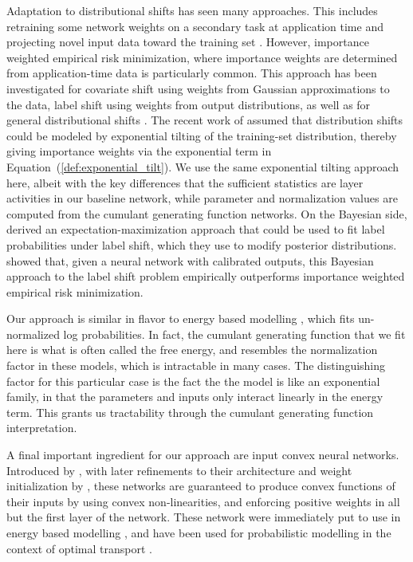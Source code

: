 \documentclass{article}      %
\begin{document}
Adaptation to distributional shifts has seen many approaches.
This includes retraining some network weights on a secondary task at application time \cite{sun_test-time_2020} and projecting novel input data toward the training set \cite{gao_back_2023}.
However, importance weighted empirical risk minimization, where importance weights are determined from application-time data is particularly common.
This approach has been investigated for covariate shift \cite{sugiyama_covariate_2007} using weights from Gaussian approximations to the data, label shift \cite{lipton_detecting_2018,garg_unified_2020} using weights from output distributions, as well as for general distributional shifts \cite{zhang_domain_2013,maity_understanding_2023}.
The recent work of \cite{maity_understanding_2023} assumed that distribution shifts could be modeled by exponential tilting of the training-set distribution, thereby giving importance weights via the exponential term in Equation~(\ref{def:exponential_tilt}).
We use the same exponential tilting approach here, albeit with the key differences that the sufficient statistics are layer activities in our baseline network, while parameter and normalization values are computed from the cumulant generating function networks.
On the Bayesian side, \cite{saerens_adjusting_2002} derived an expectation-maximization approach that could be used to fit label probabilities under label shift, which they use to modify posterior distributions.
\cite{alexandari_maximum_2020} showed that, given a neural network with calibrated outputs, this Bayesian approach to the label shift problem empirically outperforms importance weighted empirical risk minimization.



Our approach is similar in flavor to energy based modelling \cite{lecun_tutorial_2006}, which fits un-normalized log probabilities.
In fact, the cumulant generating function that we fit here is what is often called the free energy, and resembles the normalization factor in these models, which is intractable in many cases.
The distinguishing factor for this particular case is the fact the the model is like an exponential family, in that the parameters and inputs only interact linearly in the energy term.
This grants us tractability through the cumulant generating function interpretation.


A final important ingredient for our approach are input convex neural networks.
Introduced by \cite{amos_input_2017}, with later refinements to their architecture and weight initialization by \cite{hoedt_principled_2023}, these networks are guaranteed to produce convex functions of their inputs by using convex non-linearities, and enforcing positive weights in all but the first layer of the network.
These network were immediately put to use in energy based modelling \cite{amos_input_2017}, and have been used for probabilistic modelling in the context of optimal transport \cite{makkuva_optimal_2020,alvarez-melis_optimizing_2022}.
\end{document}
